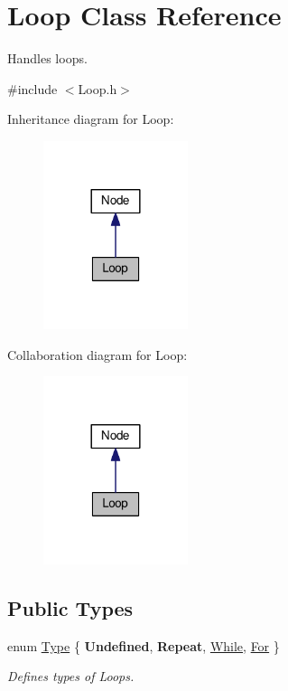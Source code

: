\hypertarget{classLoop}{}\section{Loop Class Reference}
\label{classLoop}


Handles loops.  




{\ttfamily \#include $<$Loop.\+h$>$}



Inheritance diagram for Loop\+:\nopagebreak
\begin{figure}[H]
\begin{center}
\leavevmode
\includegraphics[width=120pt]{classLoop__inherit__graph}
\end{center}
\end{figure}


Collaboration diagram for Loop\+:\nopagebreak
\begin{figure}[H]
\begin{center}
\leavevmode
\includegraphics[width=120pt]{classLoop__coll__graph}
\end{center}
\end{figure}
\subsection*{Public Types}
\begin{DoxyCompactItemize}
\item 
enum \hyperlink{classLoop_af57e9c094063c514758dfe7bd986d6e7}{Type} \{ {\bfseries Undefined}, 
{\bfseries Repeat}, 
\hyperlink{classLoop_af57e9c094063c514758dfe7bd986d6e7a681be1f5a1ab60d13010c6df3358088e}{While}, 
\hyperlink{classLoop_af57e9c094063c514758dfe7bd986d6e7a7637227f2d51adc47dea05b5fe6802ac}{For}
 \}
\begin{DoxyCompactList}\small\item\em Defines types of Loops. \end{DoxyCompactList}\end{DoxyCompactItemize}

